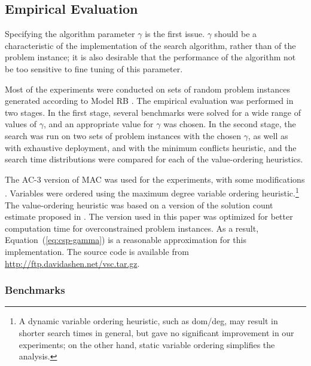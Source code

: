 \subsection{Empirical Evaluation}
\label{sec:empirical}


Specifying the algorithm parameter $\gamma$ is the first issue.
$\gamma$ should be a characteristic of the
implementation of the search algorithm, rather than of the problem
instance; it is also desirable that the performance of the algorithm not
be too sensitive to fine tuning of this parameter.


Most of the  experiments were conducted on sets of random problem instances
generated according to Model RB \cite{Xu.rb}. The empirical evaluation
was performed in two stages. In the first stage, several benchmarks
were solved for a wide range of values of $\gamma$, and an appropriate
value for $\gamma$ was chosen. In the second stage, the search was run
on two sets of problem instances with the chosen $\gamma$, as well as
with exhaustive deployment, and with the minimum conflicts
heuristic, and the search time distributions were compared for each of
the value-ordering heuristics.

The AC-3 version of MAC was used for the experiments, with some
modifications \cite{Sabin.mac}. Variables were ordered using the
maximum degree variable ordering heuristic.\footnote{A dynamic
variable ordering heuristic, such as dom/deg, may result in shorter
search times in general, but gave no significant improvement in our
experiments; on the other hand, static variable ordering simplifies
the analysis.} The value-ordering heuristic was based on a version
of the solution count estimate proposed in \cite{Meisels.solcount}.
The version used in this paper was optimized for better computation
time for overconstrained problem instances. As a result,
Equation~(\ref{eq:csp-gamma}) is a reasonable
approximation for this implementation. The source code is available from
\url{http://ftp.davidashen.net/vsc.tar.gz}.

\subsubsection{Benchmarks}

